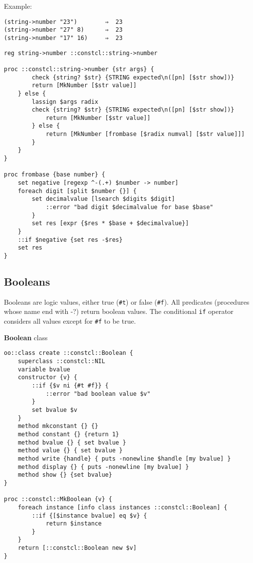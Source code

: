 \documentclass{report}
\begin{document}
Example:

\noindent\makebox[\linewidth]{\rule{\linewidth}{0.4pt}}
\begin{lstlisting}
(string->number "23")        ⇒  23
(string->number "27" 8)      ⇒  23
(string->number "17" 16)     ⇒  23
\end{lstlisting}
\noindent\makebox[\linewidth]{\rule{\linewidth}{0.4pt}}
\noindent\makebox[\linewidth]{\rule{\linewidth}{0.4pt}}
\begin{lstlisting}
reg string->number ::constcl::string->number
 
proc ::constcl::string->number {str args} {
        check {string? $str} {STRING expected\n([pn] [$str show])}
        return [MkNumber [$str value]]
    } else {
        lassign $args radix
        check {string? $str} {STRING expected\n([pn] [$str show])}
            return [MkNumber [$str value]]
        } else {
            return [MkNumber [frombase [$radix numval] [$str value]]]
        }
    }
}
 
proc frombase {base number} {
    set negative [regexp ^-(.+) $number -> number]
    foreach digit [split $number {}] {
        set decimalvalue [lsearch $digits $digit]
            ::error "bad digit $decimalvalue for base $base"
        }
        set res [expr {$res * $base + $decimalvalue}]
    }
    ::if $negative {set res -$res}
    set res
}
\end{lstlisting}
\noindent\makebox[\linewidth]{\rule{\linewidth}{0.4pt}}
\subsection{Booleans}
\label{booleans}

Booleans are logic values, either true (\texttt{\#t}) or false (\texttt{\#f}). All predicates (procedures whose name end with -?) return boolean values. The conditional \texttt{if} operator considers all values except for \texttt{\#f} to be true.


\textbf{Boolean} class

\noindent\makebox[\linewidth]{\rule{\linewidth}{0.4pt}}
\begin{lstlisting}
oo::class create ::constcl::Boolean {
    superclass ::constcl::NIL
    variable bvalue
    constructor {v} {
        ::if {$v ni {#t #f}} {
            ::error "bad boolean value $v"
        }
        set bvalue $v
    }
    method mkconstant {} {}
    method constant {} {return 1}
    method bvalue {} { set bvalue }
    method value {} { set bvalue }
    method write {handle} { puts -nonewline $handle [my bvalue] }
    method display {} { puts -nonewline [my bvalue] }
    method show {} {set bvalue}
}
 
proc ::constcl::MkBoolean {v} {
    foreach instance [info class instances ::constcl::Boolean] {
        ::if {[$instance bvalue] eq $v} {
            return $instance
        }
    }
    return [::constcl::Boolean new $v]
}
\end{lstlisting}
\noindent\makebox[\linewidth]{\rule{\linewidth}{0.4pt}}
\end{document}
